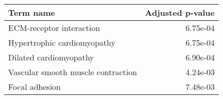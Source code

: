 \begin{tabular}{lr}
\toprule
                         Term name &  Adjusted p-value \\
\midrule
          ECM-receptor interaction &          6.75e-04 \\
       Hypertrophic cardiomyopathy &          6.75e-04 \\
            Dilated cardiomyopathy &          6.90e-04 \\
Vascular smooth muscle contraction &          4.24e-03 \\
                    Focal adhesion &          7.48e-03 \\
\bottomrule
\end{tabular}
